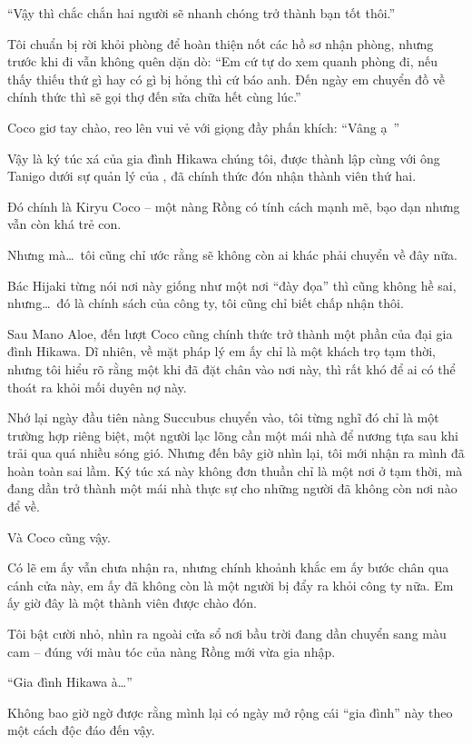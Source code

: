 \documentclass[../main.tex]{subfiles}
\begin{document}
``Vậy thì chắc chắn hai người sẽ nhanh chóng trở thành bạn tốt thôi.''

Tôi chuẩn bị rời khỏi phòng để hoàn thiện nốt các hồ sơ nhận phòng, nhưng trước khi đi vẫn không quên dặn dò: ``Em cứ tự do xem quanh phòng đi, nếu thấy thiếu thứ gì hay có gì bị hỏng thì cứ báo anh. Đến ngày em chuyển đồ về chính thức thì sẽ gọi thợ đến sửa chữa hết cùng lúc.''

Coco giơ tay chào, reo lên vui vẻ với giọng đầy phấn khích: ``Vâng ạ~{}''

\il

Vậy là ký túc xá của gia đình Hikawa chúng tôi, được thành lập cùng với ông Tanigo dưới sự quản lý của \hll, đã chính thức đón nhận thành viên thứ hai.

Đó chính là Kiryu Coco – một nàng Rồng có tính cách mạnh mẽ, bạo dạn nhưng vẫn còn khá trẻ con.

Nhưng mà\dots\ tôi cũng chỉ ước rằng sẽ không còn ai khác phải chuyển về đây nữa.

Bác Hijaki từng nói nơi này giống như một nơi ``đày đọa'' thì cũng không hề sai, nhưng\dots\ đó là chính sách của công ty, tôi cũng chỉ biết chấp nhận thôi.

Sau Mano Aloe, đến lượt Coco cũng chính thức trở thành một phần của đại gia đình Hikawa. Dĩ nhiên, về mặt pháp lý em ấy chỉ là một khách trọ tạm thời, nhưng tôi hiểu rõ rằng một khi đã đặt chân vào nơi này, thì rất khó để ai có thể thoát ra khỏi mối duyên nợ này.

Nhớ lại ngày đầu tiên nàng Succubus chuyển vào, tôi từng nghĩ đó chỉ là một trường hợp riêng biệt, một người lạc lõng cần một mái nhà để nương tựa sau khi trải qua quá nhiều sóng gió. Nhưng đến bây giờ nhìn lại, tôi mới nhận ra mình đã hoàn toàn sai lầm. Ký túc xá này không đơn thuần chỉ là một nơi ở tạm thời, mà đang dần trở thành một mái nhà thực sự cho những người đã không còn nơi nào để về.

Và Coco cũng vậy.

Có lẽ em ấy vẫn chưa nhận ra, nhưng chính khoảnh khắc em ấy bước chân qua cánh cửa này, em ấy đã không còn là một người bị đẩy ra khỏi công ty nữa. Em ấy giờ đây là một thành viên được chào đón.

Tôi bật cười nhỏ, nhìn ra ngoài cửa sổ nơi bầu trời đang dần chuyển sang màu cam – đúng với màu tóc của nàng Rồng mới vừa gia nhập.

``Gia đình Hikawa à\dots''

Không bao giờ ngờ được rằng mình lại có ngày mở rộng cái ``gia đình'' này theo một cách độc đáo đến vậy.
\end{document}
